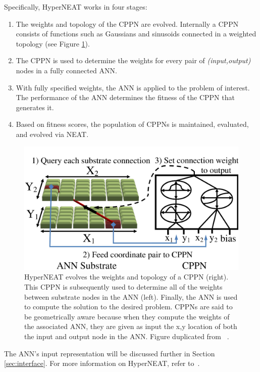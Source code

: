 \documentclass{sig-alternate}
\begin{document}
Specifically, HyperNEAT works in four stages:

\begin{enumerate}
\item The weights and topology of the CPPN are evolved. Internally a CPPN consists of functions such as Gaussians and sinusoids connected in a weighted topology (see Figure \ref{fig:cppn}).
\item The CPPN is used to determine the weights for every pair of \emph{(input,output)} nodes in a fully connected ANN.
\item With fully specified weights, the ANN is applied to the problem of interest. The performance of the ANN determines the fitness of the CPPN that generates it.
\item Based on fitness scores, the population of CPPNs is maintained, evaluated, and evolved via NEAT.
\end{enumerate}

\begin{figure}[htp]
\begin{center}
\includegraphics[width=\columnwidth]{figures/cppn}
\end{center}
\caption{HyperNEAT evolves the weights and topology of a CPPN (right). This CPPN is subsequently used to determine all of the weights between substrate nodes in the ANN (left). Finally, the ANN is used to compute the solution to the desired problem. CPPNs are said to be geometrically aware because when they compute the weights of the associated ANN, they are given as input the x,y location of both the input and output node in the ANN. Figure duplicated from ~\cite{verbancsics10}.}
\label{fig:cppn}
\end{figure}

The ANN's input representation will be discussed further in Section \ref{sec:interface}. For more information on HyperNEAT, refer to~\cite{gauci08}.
\end{document}
